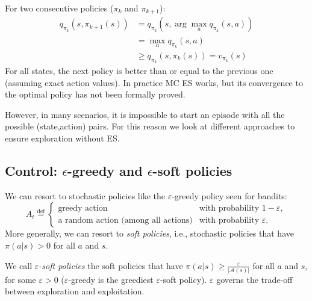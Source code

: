 For two consecutive policies ($\pi_k$ and $\pi_{k+1}$):
\begin{equation}
  \begin{split}
    q_{\pi_k}(s,\pi_{k+1}(s))&=q_{\pi_k}(s,\arg\max_a q_{\pi_k}(s,a))\\
    &=\max_a q_{\pi_k}(s,a)\\
    &\geq q_{\pi_k}(s,\pi_k(s))=v_{\pi_k}(s)
  \end{split}
\end{equation}
For all states, the next policy is better than or equal to the previous one (assuming exact action values). In practice MC ES works, but its convergence to the optimal policy has not been formally proved.

However, in many scenarios, it is impossible to start an episode with all the possible (state,action) pairs. For this reason we look at different approaches to ensure exploration without ES.
\subsection{Control: \texorpdfstring{$\epsilon$}{epsilon}-greedy and \texorpdfstring{$\epsilon$}{epsilon}-soft policies}
We can resort to stochastic policies like the $\varepsilon$-greedy policy seen for bandits:
\[
A_t \overset{\mathrm{def}}{=}
\begin{cases}
\text{greedy action} & \text{with probability } 1-\varepsilon,\\
\text{a random action (among all actions)} & \text{with probability } \varepsilon.
\end{cases}
\]
More generally, we can resort to \textit{soft policies}, i.e., stochastic policies that have $\pi(a|s)>0$ for all $a$ and $s$.

We call \textit{$\varepsilon$-soft policies} the soft policies that have $\pi(a|s)\geq\frac{\varepsilon}{|\mathcal{A}(s)|}$ for all $a$ and $s$, for some $\varepsilon>0$ ($\varepsilon$-greedy is the greediest $\varepsilon$-soft policy). $\varepsilon$ governs the trade-off between exploration and exploitation.

